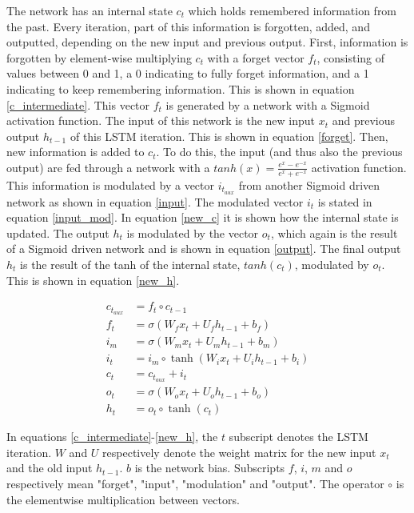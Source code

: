 \documentclass[journal,10pt,twoside, a4paper]{IEEEtran}
\begin{document}
The network has an internal state $c_t$ which holds remembered information from the past. Every iteration, part of this information is forgotten, added, and outputted, depending on the new input and previous output. First, information is forgotten by element-wise multiplying $c_t$ with a forget vector $f_t$, consisting of values between 0 and 1, a 0 indicating to fully forget information, and a 1 indicating to keep remembering information. This is shown in equation \ref{c_intermediate}. This vector $f_t$ is generated by a network with a Sigmoid activation function. The input of this network is the new input $x_t$ and previous output $h_{t-1}$ of this LSTM iteration. This is shown in equation \ref{forget}. Then, new information is added to $c_t$. To do this, the input (and thus also the previous output) are fed through a network with a $tanh(x) = \frac{e^x - e^{-x}}{e^x + e^{-x}}$ activation function. This information is modulated by a vector $i_{t_{aux}}$ from another Sigmoid driven network as shown in equation \ref{input}. The modulated vector $i_t$ is stated in equation \ref{input_mod}. In equation \ref{new_c} it is shown how the internal state is updated. The output $h_t$ is modulated by the vector $o_t$, which again is the result of a Sigmoid driven network and is shown in equation \ref{output}. The final output $h_t$ is the result of the tanh of the internal state, $tanh(c_t)$, modulated by $o_t$. This is shown in equation \ref{new_h}. 

\begin{align}
    c_{t_{aux}} &= f_t \circ c_{t-1} \label{c_intermediate}\\
    f_t &= \sigma\left(W_fx_t + U_fh_{t-1}+b_f\right) \label{forget}\\
    i_m &= \sigma\left(W_mx_t + U_mh_{t-1}+b_m\right) \label{input}\\
    i_t &= i_m \circ \tanh\left(W_ix_t + U_ih_{t-1}+b_i\right) \label{input_mod}\\
    c_t &= c_{t_{aux}} + i_t \label{new_c}\\
    o_t &= \sigma\left(W_ox_t + U_oh_{t-1}+b_o\right) \label{output}\\
    h_t &= o_t \circ \tanh\left(c_t\right) \label{new_h}
\end{align}

In equations \ref{c_intermediate}-\ref{new_h}, the $t$ subscript denotes the LSTM iteration. $W$ and $U$ respectively denote the weight matrix for the new input $x_t$ and the old input $h_{t-1}$. $b$ is the network bias. Subscripts $f$, $i$, $m$ and $o$ respectively mean "forget", "input", "modulation" and "output". The operator $\circ$ is the elementwise multiplication between vectors.
\end{document}
